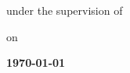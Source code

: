 \begin{titlepage}
\begin{center}
        \vspace{0.6cm}
        {\fontsize{12}{14}\selectfont under the supervision of \par}
        \vspace{0.3cm}
        {\fontsize{12}{14}\selectfont \textbf{} \par}

        \vfill

        {\fontsize{12}{14}\selectfont on \par}
        \vspace{0.3cm}
        {\fontsize{12}{14}\selectfont \textbf{\today} \par}
    \end{center}
\end{titlepage}
